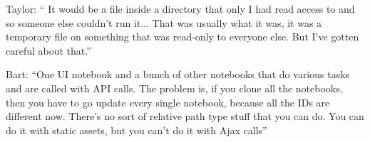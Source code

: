 Taylor: `` It would be a file inside a directory that only I had read access to and so someone else couldn't run it... That was usually what it was, it was a temporary file on something that was read-only to everyone else. But I've gotten careful about that.''

Bart: ``One UI notebook and a bunch of other notebooks that do various tasks and are called with API calls. The problem is, if you clone all the notebooks, then you have to go update every single notebook, because all the IDs are different now. There's no sort of relative path type stuff that you can do. You can do it with static assets, but you can't do it with Ajax calls''
